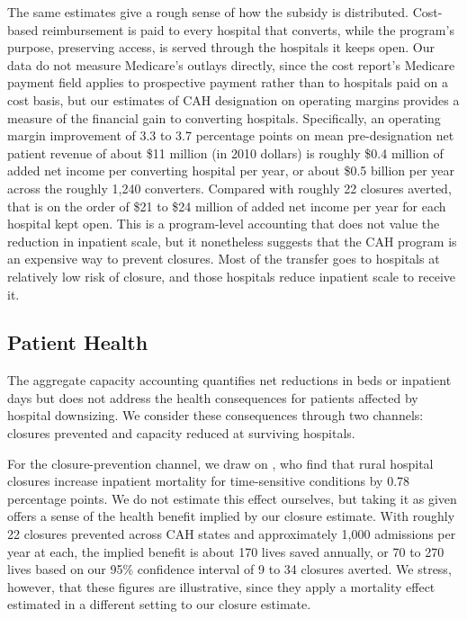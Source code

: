 \documentclass[a4paper, 12pt, twoside]{article}
\begin{document}
The same estimates give a rough sense of how the subsidy is distributed. Cost-based reimbursement is paid to every hospital that converts, while the program's purpose, preserving access, is served through the hospitals it keeps open. Our data do not measure Medicare's outlays directly, since the cost report's Medicare payment field applies to prospective payment rather than to hospitals paid on a cost basis, but our estimates of CAH designation on operating margins provides a measure of the financial gain to converting hospitals. Specifically, an operating margin improvement of 3.3 to 3.7 percentage points on mean pre-designation net patient revenue of about \$11 million (in 2010 dollars) is roughly \$0.4 million of added net income per converting hospital per year, or about \$0.5 billion per year across the roughly 1,240 converters. Compared with roughly 22 closures averted, that is on the order of \$21 to \$24 million of added net income per year for each hospital kept open. This is a program-level accounting that does not value the reduction in inpatient scale, but it nonetheless suggests that the CAH program is an expensive way to prevent closures. Most of the transfer goes to hospitals at relatively low risk of closure, and those hospitals reduce inpatient scale to receive it.

\subsection{Patient Health}
\label{sec:patient_health}

The aggregate capacity accounting quantifies net reductions in beds or inpatient days but does not address the health consequences for patients affected by hospital downsizing. We consider these consequences through two channels: closures prevented and capacity reduced at surviving hospitals.

For the closure-prevention channel, we draw on \cite{gujral2019}, who find that rural hospital closures increase inpatient mortality for time-sensitive conditions by 0.78 percentage points. We do not estimate this effect ourselves, but taking it as given offers a sense of the health benefit implied by our closure estimate. With roughly 22 closures prevented across CAH states and approximately 1,000 admissions per year at each, the implied benefit is about 170 lives saved annually, or 70 to 270 lives based on our 95\% confidence interval of 9 to 34 closures averted. We stress, however, that these figures are illustrative, since they apply a mortality effect estimated in a different setting to our closure estimate.
\end{document}
